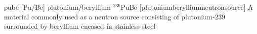 \newglsXchemical%
{pube}%
[Pu/Be]%
{plutonium/beryllium}%
{{}$^{239}$PuBe}%
[plutoniumberylliumneutronsource]%
{A material commonly used as a neutron source consisting of plutonium-239 surrounded by beryllium encased in stainless steel}%